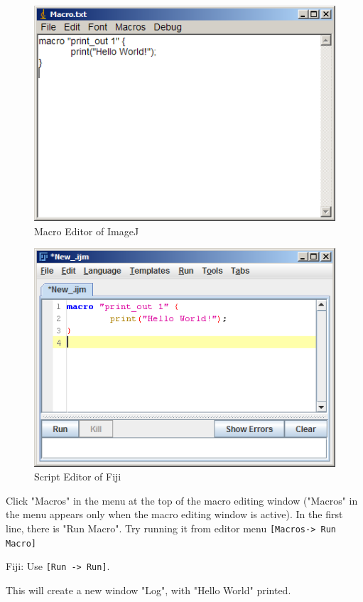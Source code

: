 \documentclass[11pt,a4paper,oneside]{report}
\newenvironment{indentFiji}%
{\begin{list}{}%
         {\setlength{\leftmargin}{1em}}%
         \item[]%
}
{\end{list}}
\newcommand{\ijmenu}[1]{\texttt{\small#1}}
\begin{document}
\begin{figure}[htbp]
\begin{center}
\includegraphics[scale=0.6]{fig/editor_helloworld_IJ.png}
\caption{Macro Editor of ImageJ} \label{fig_MacroEditor}
\end{center}
\end{figure}

\begin{figure}[htbp]
\begin{center}
\includegraphics[scale=0.6]{fig/editor_helloworld_fiji.png}
\caption{Script Editor of Fiji} \label{fig_ScriptEditor}
\end{center}
\end{figure}

Click "Macros" in the menu at the top of the macro editing window 
("Macros" in the menu appears only when the macro editing window is active). 
In the first line, there is "Run Macro". 
Try running it from editor menu \ijmenu{[Macros-> Run Macro]} 
\begin{indentFiji}
Fiji:  Use \ijmenu{[Run -> Run]}. 
\end{indentFiji}
This will create a new window "Log", with "Hello World" printed. 
\end{document}
